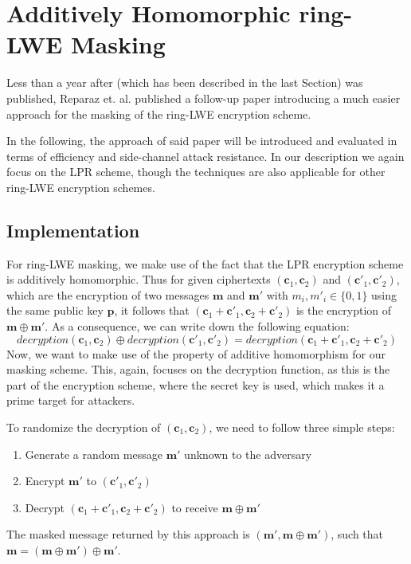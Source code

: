 %
%

\chapter{Additively Homomorphic ring-LWE Masking}
Less than a year after \cite{maskedRing} (which has been described in the last Section) was published, Reparaz et. al. published a follow-up paper \cite{Reparaz2016} introducing a much easier approach for the masking of the \ac{ring-LWE} encryption scheme.

In the following, the approach of said paper will be introduced and evaluated in terms of efficiency and side-channel attack resistance. In our description we again focus on the \ac{LPR} scheme, though the techniques are also applicable for other \ac{ring-LWE} encryption schemes.

\section{Implementation}
For \ac{ring-LWE} masking, we make use of the fact that the \ac{LPR} encryption scheme is additively homomorphic. Thus for given ciphertexts \((\textbf{c}_1, \textbf{c}_2)\) and \((\textbf{c}'_1, \textbf{c}'_2)\), which are the encryption of two messages \(\textbf{m}\) and \(\textbf{m}'\) with \(m_i, m'_i \in \{0,1\}\) using the same public key \(\textbf{p}\), it follows that \((\textbf{c}_1+\textbf{c}'_1, \textbf{c}_2+\textbf{c}'_2)\) is the encryption of \(\textbf{m} \oplus \textbf{m}'\). As a consequence, we can write down the following equation:
\begin{equation}
	decryption(\textbf{c}_1,\textbf{c}_2) \oplus decryption(\textbf{c}'_1,\textbf{c}'_2) = decryption(\textbf{c}_1 + \textbf{c}'_1,\textbf{c}_2 + \textbf{c}'_2)
\end{equation}
Now, we want to make use of the property of additive homomorphism for our masking scheme. This, again, focuses on the decryption function, as this is the part of the encryption scheme, where the secret key is used, which makes it a prime target for attackers.

To randomize the decryption of \((\textbf{c}_1, \textbf{c}_2)\), we need to follow three simple steps:
\begin{enumerate}
\item Generate a random message \(\textbf{m}'\) unknown to the adversary
\item Encrypt \(\textbf{m}'\) to \((\textbf{c}'_1, \textbf{c}'_2)\)
\item Decrypt \((\textbf{c}_1+\textbf{c}'_1, \textbf{c}_2+\textbf{c}'_2)\) to receive \(\textbf{m} \oplus \textbf{m}'\)
\end{enumerate}
The masked message returned by this approach is \((\textbf{m}', \textbf{m} \oplus \textbf{m}')\), such that \(\textbf{m} = (\textbf{m} \oplus \textbf{m}') \oplus \textbf{m}'\).

